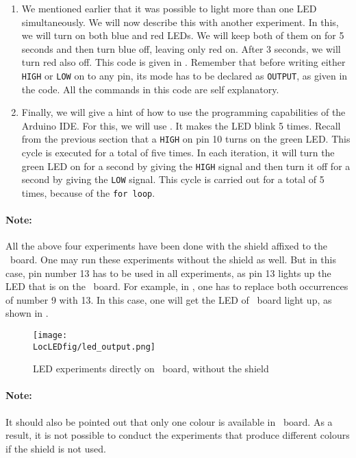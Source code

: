 \begin{enumerate}
  \item We mentioned earlier that it was possible to light more than one
        LED simultaneously.  We will now describe this with another
        experiment.  In this, we will turn on both blue and red LEDs.  We
        will keep both of them on for 5 seconds and then turn blue off,
        leaving only red on.  After 3 seconds, we will turn red also off.
        This code is given in .  Remember that
        before writing either {\tt HIGH} or {\tt LOW} on to any pin, its
        mode has to be declared as {\tt OUTPUT}, as given in the code.  All
        the commands in this code are self explanatory.
        
  \item Finally, we will give a hint of how to use the programming
        capabilities of the Arduino IDE.  For this, we will use
        .  It makes the LED blink 5 times.  Recall
        from the previous section that a {\tt HIGH} on pin 10 turns on the
        green LED.  This cycle is executed for a total of five times.  In each
        iteration, it will turn the green LED on for a second by giving the
          {\tt HIGH} signal and then turn it off for a second by giving the
          {\tt LOW} signal.  This cycle is carried out for a total of 5 times,
        because of the {\tt for loop}.
\end{enumerate}

\paragraph{Note:}
All the above four experiments have been done with
the shield affixed to the \arduino\ board.  One may run these
experiments without the shield as well.  But in this case, pin number
13 has to be used in all experiments, as pin 13 lights up the LED that
is on the \arduino\ board.  For example, in , one
has to replace both occurrences of number 9 with 13.  In this case,
one will get the LED of \arduino\ board light up, as shown in
.
\begin{figure}
  \centering
  \texttt{[image: \\LocLEDfig/led\_output.png]}
  \caption{LED experiments directly on \arduino\ board, without the
    shield}
  \label{fig:led-uno}
\end{figure}


\paragraph{Note:} It should also be pointed out that only one colour
is available in \arduino\ board.  As a result, it is not possible to
conduct the experiments that produce different colours if the
shield is not used.

